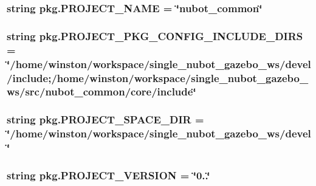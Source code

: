 \hypertarget{namespacepkg_a7dfbe99257c26f5e4a3a5483995d9ddc}{
\subsubsection[{P\-R\-O\-J\-E\-C\-T\-\_\-\-N\-A\-M\-E}]{\setlength{\rightskip}{0pt plus 5cm}string pkg.\-P\-R\-O\-J\-E\-C\-T\-\_\-\-N\-A\-M\-E = \char`\"{}nubot\-\_\-common\char`\"{}}}\label{namespacepkg_a7dfbe99257c26f5e4a3a5483995d9ddc}
\hypertarget{namespacepkg_a2760bf8266ff58da440f65ee91b203ab}{
\subsubsection[{P\-R\-O\-J\-E\-C\-T\-\_\-\-P\-K\-G\-\_\-\-C\-O\-N\-F\-I\-G\-\_\-\-I\-N\-C\-L\-U\-D\-E\-\_\-\-D\-I\-R\-S}]{\setlength{\rightskip}{0pt plus 5cm}string pkg.\-P\-R\-O\-J\-E\-C\-T\-\_\-\-P\-K\-G\-\_\-\-C\-O\-N\-F\-I\-G\-\_\-\-I\-N\-C\-L\-U\-D\-E\-\_\-\-D\-I\-R\-S = \char`\"{}/home/winston/workspace/single\-\_\-nubot\-\_\-gazebo\-\_\-ws/devel/include;/home/winston/workspace/single\-\_\-nubot\-\_\-gazebo\-\_\-ws/src/nubot\-\_\-common/core/include\char`\"{}}}\label{namespacepkg_a2760bf8266ff58da440f65ee91b203ab}
\hypertarget{namespacepkg_a3f0f1b4bc03c596525e025539ca4332f}{
\subsubsection[{P\-R\-O\-J\-E\-C\-T\-\_\-\-S\-P\-A\-C\-E\-\_\-\-D\-I\-R}]{\setlength{\rightskip}{0pt plus 5cm}string pkg.\-P\-R\-O\-J\-E\-C\-T\-\_\-\-S\-P\-A\-C\-E\-\_\-\-D\-I\-R = \char`\"{}/home/winston/workspace/single\-\_\-nubot\-\_\-gazebo\-\_\-ws/devel\char`\"{}}}\label{namespacepkg_a3f0f1b4bc03c596525e025539ca4332f}
\hypertarget{namespacepkg_ab1037914b9286bb61855131c06149648}{
\subsubsection[{P\-R\-O\-J\-E\-C\-T\-\_\-\-V\-E\-R\-S\-I\-O\-N}]{\setlength{\rightskip}{0pt plus 5cm}string pkg.\-P\-R\-O\-J\-E\-C\-T\-\_\-\-V\-E\-R\-S\-I\-O\-N = \char`\"{}0..\char`\"{}}}\label{namespacepkg_ab1037914b9286bb61855131c06149648}
